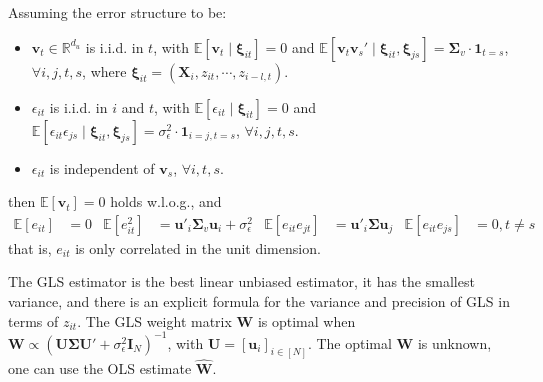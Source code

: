 \documentclass[twoside]{article}
\begin{document}
Assuming the error structure to be: 
\begin{itemize}
    \item $\mathbf{v}_t\in\mathbb{R}^{d_u}$ is i.i.d. in $t$, with $\mathbb{E}\left[\mathbf{v}_t\mid \boldsymbol{\xi}_{it}\right]=0$ and $\mathbb{E}\left[\mathbf{v}_t\mathbf{v}_s'\mid \boldsymbol{\xi}_{it},\boldsymbol{\xi}_{js}\right] = \boldsymbol{\Sigma}_v\cdot\mathbf{1}_{t=s}$, $\forall i,j,t,s$, where $\boldsymbol{\xi}_{it}=\left(\mathbf{X}_i,z_{it},\cdots,z_{i-l,t}\right)$.
    \item $\epsilon_{it}$ is i.i.d. in $i$ and $t$, with $\mathbb{E}\left[\epsilon_{it}\mid\boldsymbol{\xi}_{it}\right]=0$ and $\mathbb{E}[\epsilon_{it}\epsilon_{js}\mid\boldsymbol{\xi}_{it},\boldsymbol{\xi}_{js}]=\sigma^2_{\epsilon}\cdot\mathbf{1}_{i=j,t=s}$, $\forall i,j,t,s$.
    \item $\epsilon_{it}$ is independent of $\mathbf{v}_s$, $\forall i,t,s$.
\end{itemize}
then $\mathbb{E}\left[\mathbf{v}_t\right]=0$ holds w.l.o.g., and 
\begin{align*}
    \mathbb{E}[e_{it}]&=0 & \mathbb{E}\left[e^2_{it}\right]&=\mathbf{u}'_i\boldsymbol{\Sigma}_v\mathbf{u}_i + \sigma^2_{\epsilon} & \mathbb{E}\left[e_{it}e_{jt}\right]&=\mathbf{u}'_i\boldsymbol{\Sigma}\mathbf{u}_j &\mathbb{E}[e_{it}e_{js}]&=0,t\neq s
\end{align*}
that is, $e_{it}$ is only correlated in the unit dimension.

The GLS estimator is the best linear unbiased estimator, it has the smallest variance, and there is an explicit formula for the variance and precision of GLS in terms of $z_{it}$.
The GLS weight matrix $\mathbf{W}$ is optimal when $\mathbf{W}\propto \left(\mathbf{U}\boldsymbol{\Sigma}\mathbf{U}'+\sigma^2_{\epsilon}\mathbf{I}_N\right)^{-1}$, with $\mathbf{U}=[\mathbf{u}_i]_{i\in[N]}$. The optimal $\mathbf{W}$ is unknown, one can use the OLS estimate $\hat{\mathbf{W}}$.
\end{document}
